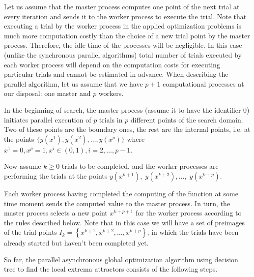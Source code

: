 \documentclass{svproc}
\begin{document}
Let us assume that the master process computes one point of the next trial at every iteration and sends  it to the worker process to execute the trial. Note that executing a trial by the worker process in  the applied optimization problems is much more computation costly than the choice of a new trial point  by the master process. Therefore, the idle time of the processes will be negligible. In this  case (unlike the synchronous parallel algorithms) total number of trials executed by each worker  process will depend on the computation costs for executing particular trials and cannot be estimated in  advance. When describing the parallel algorithm, let us assume that we have $p+1$ computational  processes at our disposal: one master and $p$ workers.

In the beginning of search, the master process (assume it to have the identifier $0$) initiates parallel  execution of $p$ trials in $p$ different points of the search domain.
Two of these points are the boundary ones, the rest are the internal points, i.e. at the points  $\{y\left(x^1\right),y\left(x^2\right),\ldots,y\left(x^p\right)\}$ where $x^1=0,x^p=1,x^i\in\left(0,1\right),i=2,\ldots,p-1$.

Now assume $k\geq0$ trials to be completed, and the worker processes are performing the trials at the points $y\left(x^{k+1}\right),\;y\left(x^{k+2}\right),\ldots,\;y\left(x^{k+p}\right)$.

Each worker process having completed the computing of the function at some time moment sends  the computed value to the master process. In turn, the master process selects a new point  $x^{k+p+1}$ for the worker process according to the rules described below. Note that in this case  we will have a set of preimages of the trial points  $I_k=\left\{x^{k+1},x^{k+2},\ldots,x^{k+p}\right\}$, in which the trials have been already started but haven't been completed yet.

So far, the parallel asynchronous global optimization algorithm using decision tree to find the local  extrema attractors consists of the following steps.
\end{document}
